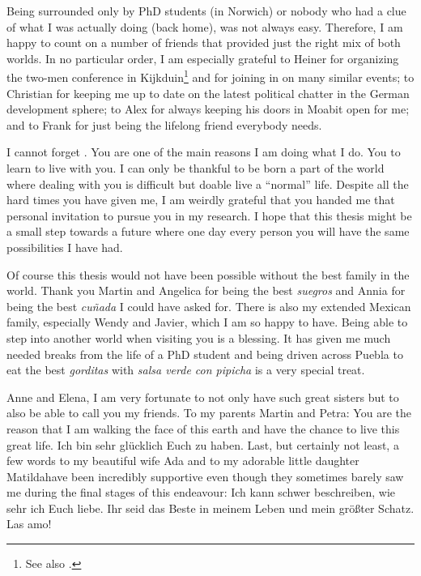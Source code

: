 Being surrounded only by PhD students (in Norwich) or nobody who had a clue of what I was actually doing (back home), was not always easy. Therefore, I am happy to count on a number of friends that provided just the right mix of both worlds. In no particular order, I am especially grateful to Heiner for organizing the two-men conference in Kijkduin\footnote{See also \textcite{Schmittdiel2016}.} and for joining in on many similar events; to Christian for keeping me up to date on the latest political chatter in the German development sphere; to Alex for always keeping his doors in Moabit open for me; and to Frank for just being the lifelong friend everybody needs.

I cannot forget \DIFdelbegin {}\DIFdelend \DIFaddbegin {}\DIFaddend . You are one of the main reasons I am doing what I do. You \DIFdelbegin {}\DIFdelend \DIFaddbegin {}\DIFaddend to learn to live with you\DIFdelbegin {}\DIFdelend . I can only be thankful to be born a part of the world where dealing with you is difficult but doable \DIFdelbegin {}\DIFdelend \DIFaddbegin {}\DIFaddend live a ``normal'' life. Despite all the hard times you have given me, I am weirdly grateful that you handed me that personal invitation to pursue you in my research.  I hope that this thesis might be a small step towards a future where one day every person \DIFdelbegin {}\DIFdelend \DIFaddbegin {}\DIFaddend you will have the same possibilities I have had.

Of course this thesis would not have been possible without the best family in the world. Thank you Martin and Angelica for being the best \textit{suegros} and Annia for being the best \textit{cu\~{n}ada} I could have asked for. There is also my extended Mexican family, especially Wendy and Javier, which I am so happy to have. Being able to step into another world when visiting you is a blessing. It has given me much needed breaks from the life of a PhD student and being driven across Puebla to eat the best \textit{gorditas} with \textit{salsa verde con pipicha} is a very special treat. 

\DIFdelbegin {}\DIFdelend Anne and Elena, \DIFdelbegin {}\DIFdelend I am very fortunate to not only have such great sisters but to also be able to call you my friends. 
To my parents Martin and Petra: You are the reason that I am walking the face of this earth and have the chance to live this great life. Ich bin sehr glücklich Euch zu haben. Last, but certainly not least, a few words to my beautiful wife Ada and to my adorable little daughter Matilda\DIFdelbegin {}\DIFdelend \DIFaddbegin {}\DIFaddend have been incredibly supportive even though they sometimes barely saw me during the final stages of this endeavour: Ich kann schwer beschreiben, wie sehr ich Euch liebe. Ihr seid das Beste in meinem Leben und mein größter Schatz. Las amo!

